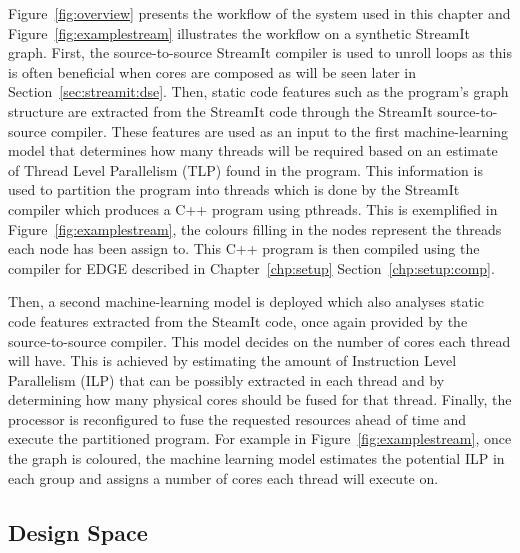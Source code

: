 Figure~\ref{fig:overview} presents the workflow of the system used in this chapter and Figure~\ref{fig:examplestream} illustrates the workflow on a synthetic StreamIt graph.
First, the source-to-source StreamIt compiler is used to unroll loops as this is often beneficial when cores are composed as will be seen later in Section~\ref{sec:streamit:dse}.
Then, static code features such as the program's graph structure are extracted from the StreamIt code through the StreamIt source-to-source compiler.
These features are used as an input to the first machine-learning model that determines how many threads will be required based on an estimate of Thread Level Parallelism (TLP) found in the program.
This information is used to partition the program into threads which is done by the StreamIt compiler which produces a C++ program using pthreads.
This is exemplified in Figure~\ref{fig:examplestream}, the colours filling in the nodes represent the threads each node has been assign to.
This C++ program is then compiled using the compiler for EDGE described in Chapter~\ref{chp:setup} Section~\ref{chp:setup:comp}.

Then, a second machine-learning model is deployed which also analyses static code features extracted from the SteamIt code, once again provided by the source-to-source compiler.
This model decides on the number of cores each thread will have.
This is achieved by estimating the amount of Instruction Level Parallelism (ILP) that can be possibly extracted in each thread and by determining how many physical cores should be fused for that thread.
Finally, the processor is reconfigured to fuse the requested resources ahead of time and execute the partitioned program.
For example in Figure~\ref{fig:examplestream}, once the graph is coloured, the machine learning model estimates the potential ILP in each group and assigns a number of cores each thread will execute on.

\subsection{Design Space}

